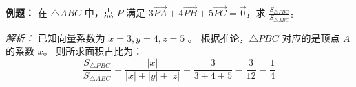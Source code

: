\begin{examplebox}
\textbf{例题：} 在 $\triangle ABC$ 中，点 $P$ 满足 $3\vec{PA} + 4\vec{PB} + 5\vec{PC} = \vec{0}$，求 $\frac{S_{\triangle PBC}}{S_{\triangle ABC}}$。

\textit{解析：} 
已知向量系数为 $x=3, y=4, z=5$ 。
根据推论，$\triangle PBC$ 对应的是顶点 $A$ 的系数 $x$。
则所求面积占比为：
\[ \frac{S_{\triangle PBC}}{S_{\triangle ABC}} = \frac{|x|}{|x|+|y|+|z|} = \frac{3}{3+4+5} = \frac{3}{12} = \frac{1}{4} \]
\end{examplebox}